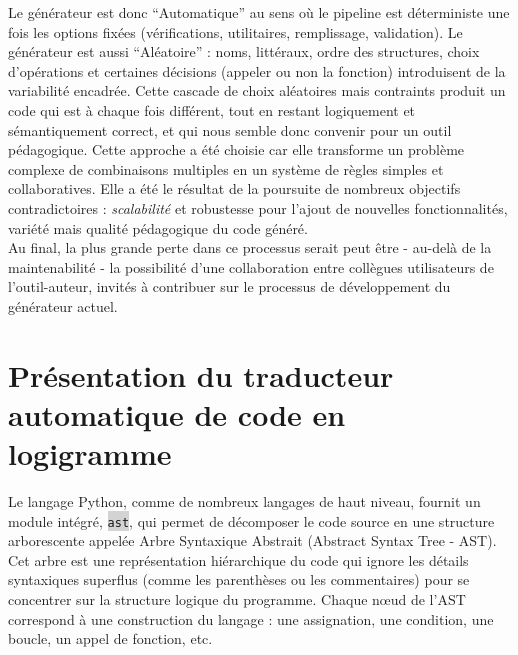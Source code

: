 \documentclass[11pt,a4paper]{article}
\newcommand{\code}[1]{\colorbox{lightgray}{\texttt{\small #1}}}
\begin{document}
Le générateur est donc ``Automatique'' au sens où le pipeline est déterministe une fois les options fixées (vérifications, utilitaires, remplissage, validation). 
\newline
Le générateur est aussi ``Aléatoire'' : noms, littéraux, ordre des structures, choix d’opérations et certaines décisions (appeler ou non la fonction) introduisent de la variabilité encadrée.
\newline
Cette cascade de choix aléatoires mais contraints produit un code qui est à chaque fois différent, tout en restant logiquement et sémantiquement correct, et qui nous semble donc convenir pour un outil pédagogique. Cette approche a été choisie car elle transforme un problème complexe de combinaisons multiples en un système de règles simples et collaboratives. Elle a été le résultat de la poursuite de nombreux objectifs contradictoires : \textit{scalabilité} et robustesse pour l'ajout de nouvelles fonctionnalités, variété mais qualité pédagogique du code généré. \\ Au final, la plus grande perte dans ce processus serait peut être - au-delà de la maintenabilité - la possibilité d'une collaboration entre collègues utilisateurs de l'outil-auteur, invités à contribuer sur le processus de développement du générateur actuel.

\clearpage
\noindent



\clearpage
\section{Présentation du traducteur automatique de code en logigramme}

Le langage Python, comme de nombreux langages de haut niveau, fournit un module intégré, \code{ast}, qui permet de décomposer le code source en une structure arborescente appelée Arbre Syntaxique Abstrait (Abstract Syntax Tree - AST). Cet arbre est une représentation hiérarchique du code qui ignore les détails syntaxiques superflus (comme les parenthèses ou les commentaires) pour se concentrer sur la structure logique du programme. Chaque nœud de l'AST correspond à une construction du langage : une assignation, une condition, une boucle, un appel de fonction, etc. \\
\end{document}

